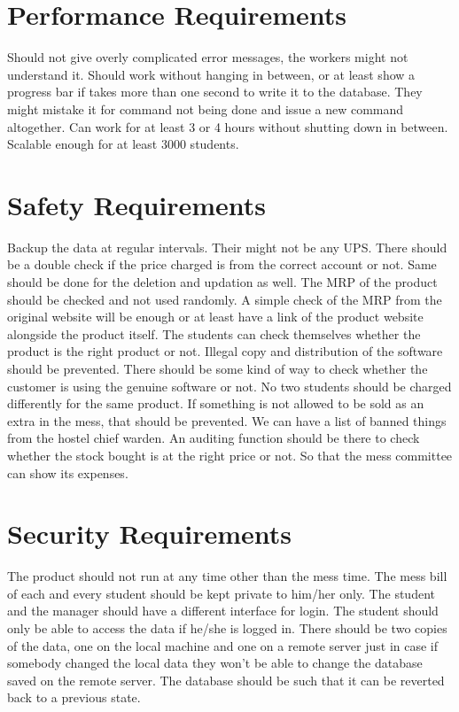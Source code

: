 \documentclass{scrreprt}
\begin{document}
\section{Performance Requirements}
Should not give overly complicated error messages, the workers might not understand it.
Should work without hanging in between, or at least show a progress bar if takes more than one second to write it to the database.
They might mistake it for command not being done and issue a new command altogether.
Can work for at least 3 or 4 hours without shutting down in between.
Scalable enough for at least 3000 students.

\section{Safety Requirements}
Backup the data at regular intervals. Their might not be any UPS.
There should be a double check if the price charged is from the correct account or not. Same should be done for the deletion and updation as well. The MRP of the product should be checked and not used randomly. A simple check of the MRP from the original website will be enough or at least have a link of the product website alongside the product itself. The students can check themselves whether the product is the right product or not.
Illegal copy and distribution of the software should be prevented.
There should be some kind of way to check whether the customer is using the genuine software or not.
No two students should be charged differently for the same product.
If something is not allowed to be sold as an extra in the mess, that should be prevented. We can have a list of banned things from the hostel chief warden.
An auditing function should be there to check whether the stock bought is at the right price or not. So that the mess committee can show its expenses.

\section{Security Requirements}
The product should not run at any time other than the mess time.
The mess bill of each and every student should be kept private to him/her only. The student and the manager should have a different interface for login. The student should only be able to access the data if he/she is logged in.
There should be two copies of the data, one on the local machine and one on a remote server just in case if somebody changed the local data they won't be able to change the database saved on the remote server.
The database should be such that it can be reverted back to a previous state.
\end{document}
